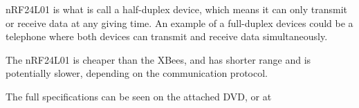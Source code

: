 nRF24L01 is what is call a half-duplex device, which means it can only transmit or receive data at any giving time. An example of a full-duplex devices could be a telephone where both devices can transmit and receive data simultaneously.

The nRF24L01 is cheaper than the XBees, and has shorter range and is potentially slower, depending on the communication protocol.

The full specifications can be seen on the attached DVD, or at \cite{nf24datasheet}

